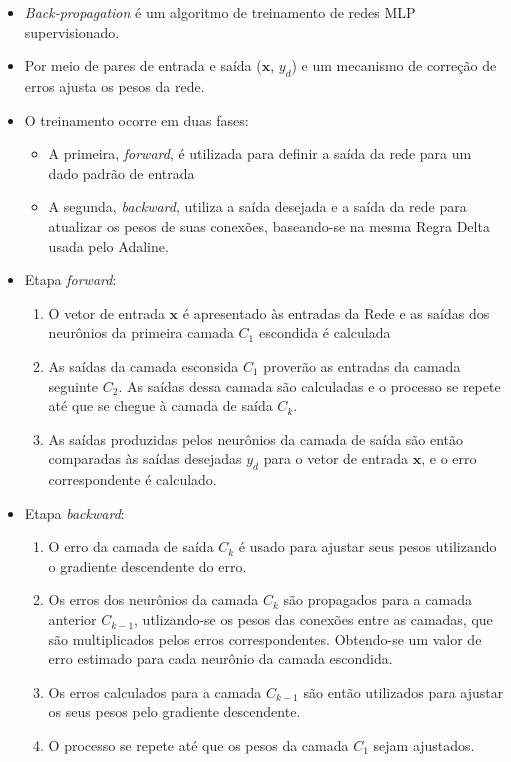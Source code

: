 \documentclass{article}
\begin{document}
\begin{itemize}
		\begin{itemize}
			\item \textit{Back-propagation} é um algoritmo de treinamento de redes MLP supervisionado.
			\item Por meio de pares de entrada e saída ($\mathbf{x}$, $y_d$) e um mecanismo de correção de erros ajusta os pesos da rede.
			\item O treinamento ocorre em duas fases:
			\begin{itemize}
				\item A primeira, \textit{forward}, é utilizada para definir a saída da rede para um dado padrão de entrada
				\item A segunda, \textit{backward}, utiliza a saída desejada e a saída da rede para atualizar os pesos de suas conexões, baseando-se na mesma Regra Delta usada pelo Adaline.
			\end{itemize}
			\item Etapa \textit{forward}:
			\begin{enumerate}
				\item O vetor de entrada $\mathbf{x}$ é apresentado às entradas da Rede e as saídas dos neurônios da primeira camada $C_1$ escondida é calculada
				\item As saídas da camada esconsida $C_1$ proverão as entradas da camada seguinte $C_2$. As saídas dessa camada são calculadas e o processo se repete até que se chegue à camada de saída $C_k$.
				\item As saídas produzidas pelos neurônios da camada de saída são então comparadas às saídas desejadas $y_d$ para o vetor de entrada $\mathbf{x}$, e o erro correspondente é calculado.
			\end{enumerate}
			\item Etapa \textit{backward}:
			\begin{enumerate}
				\item O erro da camada de saída $C_k$ é usado para ajustar seus pesos utilizando o gradiente descendente do erro.
				\item Os erros dos neurônios da camada $C_k$ são propagados para a camada anterior $C_{k-1}$, utlizando-se os pesos das conexões entre as camadas, que são multiplicados pelos erros correspondentes. Obtendo-se um valor de erro estimado para cada neurônio da camada escondida.
				\item Os erros calculados para a camada $C_{k-1}$ são então utilizados para ajustar os seus pesos pelo gradiente descendente.
				\item O processo se repete até que os pesos da camada $C_1$ sejam ajustados.

\end{enumerate}
\end{itemize}
\end{itemize}
\end{document}
